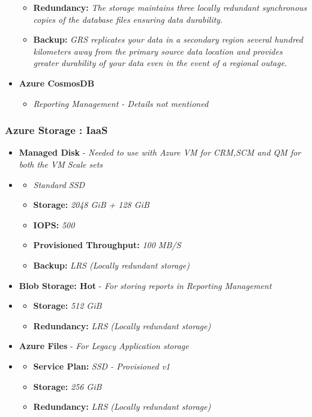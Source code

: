 \documentclass{llncs}
\begin{document}
\begin{itemize}
\begin{itemize}
            \item  \textbf{Redundancy:} \textit{The storage maintains three locally redundant synchronous copies of the database files ensuring data durability.}
            \item  \textbf{Backup:} \textit{GRS replicates your data in a secondary region several hundred kilometers away from the primary source data location and provides greater durability of your data even in the event of a regional outage.}
        \end{itemize}
  \item \textbf{Azure CosmosDB} 
    \begin{itemize}
        \item \textit{Reporting Management - Details not mentioned}
       
    \end{itemize}
\end{itemize}

\subsubsection{Azure Storage : IaaS} \leavevmode\newline
\begin{itemize}
    \item \textbf{Managed Disk} - \textit{Needed to use with Azure VM for CRM,SCM and QM for both the VM Scale sets}
    \item \begin{itemize}
        \item \textit{Standard SSD}
        \item  \textbf{Storage:} \textit{2048 GiB + 128 GiB}
        \item  \textbf{IOPS:} \textit{500}
        \item  \textbf{Provisioned Throughput:} \textit{100 MB/S}
        \item  \textbf{Backup:} \textit{LRS (Locally redundant storage)}     
    \end{itemize} 
    \item \textbf{Blob Storage: Hot} - \textit{For storing reports in Reporting Management}
    \item \begin{itemize}
        \item  \textbf{Storage:} \textit{512 GiB}
        \item  \textbf{Redundancy:} \textit{LRS (Locally redundant storage)}     
    \end{itemize} 
    \item \textbf{Azure Files} - \textit{For Legacy Application storage}
    \item \begin{itemize}
        \item  \textbf{Service Plan:} \textit{SSD - Provisioned v1}
        \item  \textbf{Storage:} \textit{256 GiB}
        \item  \textbf{Redundancy:} \textit{LRS (Locally redundant storage)}     
    \end{itemize}
\end{itemize}
\end{document}
